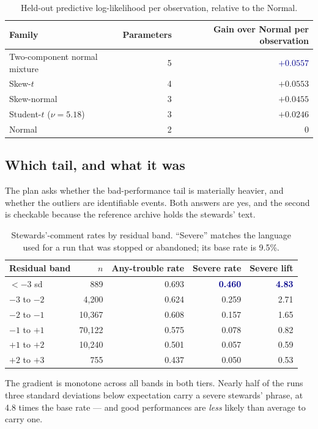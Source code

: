 \documentclass[11pt,a4paper]{article}
\newcommand{\good}[1]{\textcolor{darkblue}{\textbf{#1}}}
\begin{document}
\begin{table}[htbp]\centering\small
\caption{Held-out predictive log-likelihood per observation, relative to the Normal.}
\begin{tabular}{lrr}
\toprule
Family & Parameters & Gain over Normal per observation\\
\midrule
Two-component normal mixture & 5 & \good{$+0.0557$}\\
Skew-$t$ & 4 & $+0.0553$\\
Skew-normal & 3 & $+0.0455$\\
Student-$t$ ($\nu=5.18$) & 3 & $+0.0246$\\
Normal & 2 & 0\\
\bottomrule
\end{tabular}
\end{table}

\subsection{Which tail, and what it was}

The plan asks whether the bad-performance tail is materially heavier, and whether
the outliers are identifiable events. Both answers are yes, and the second is
checkable because the reference archive holds the stewards' text.

\begin{table}[htbp]\centering\small
\caption{Stewards'-comment rates by residual band. ``Severe'' matches the language
used for a run that was stopped or abandoned; its base rate is 9.5\%.}
\begin{tabular}{lrrrr}
\toprule
Residual band & $n$ & Any-trouble rate & Severe rate & Severe lift\\
\midrule
$<-3$ sd & 889 & 0.693 & \good{0.460} & \good{4.83}\\
$-3$ to $-2$ & 4{,}200 & 0.624 & 0.259 & 2.71\\
$-2$ to $-1$ & 10{,}367 & 0.608 & 0.157 & 1.65\\
$-1$ to $+1$ & 70{,}122 & 0.575 & 0.078 & 0.82\\
$+1$ to $+2$ & 10{,}240 & 0.501 & 0.057 & 0.59\\
$+2$ to $+3$ & 755 & 0.437 & 0.050 & 0.53\\
\bottomrule
\end{tabular}
\end{table}

The gradient is monotone across all bands in both tiers. Nearly half of the runs
three standard deviations below expectation carry a severe stewards' phrase, at
4.8 times the base rate --- and good performances are \emph{less} likely than
average to carry one.
\end{document}
